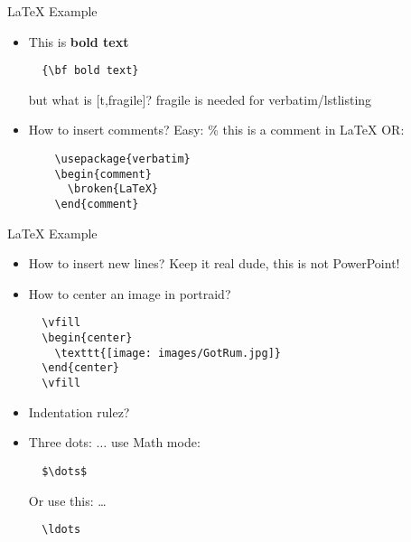 
\begin{frame}[t,plain]
  \titlepage
\end{frame}

\begin{frame}[t,fragile]{LaTeX Example}
\begin{itemize}
  \item This is {\bf bold text}
  \begin{lstlisting}
  {\bf bold text}
  \end{lstlisting}
but what is [t,fragile]?
fragile is needed for verbatim/lstlisting
  \item How to insert comments?
  Easy: \% this is a comment in LaTeX
  OR:
  \begin{lstlisting}
    \usepackage{verbatim}
    \begin{comment}
      \broken{LaTeX}
    \end{comment}
  \end{lstlisting}
  \end{itemize}
\end{frame}

\begin{frame}[t,fragile]{LaTeX Example}  
\begin{itemize}
  \item How to insert new lines?
  Keep it real dude, this is not PowerPoint!
  \item How to center an image in portraid?
  \begin{lstlisting}
  \vfill
  \begin{center}
    \texttt{[image: images/GotRum.jpg]}
  \end{center}
  \vfill
  \end{lstlisting}
  \item Indentation rulez?
  \item Three dots: $\dots$
  use Math mode: 
  \begin{lstlisting}
  $\dots$
  \end{lstlisting}
  Or use this: \ldots
  \begin{lstlisting}
  \ldots
  \end{lstlisting}
\end{itemize}
\end{frame}

